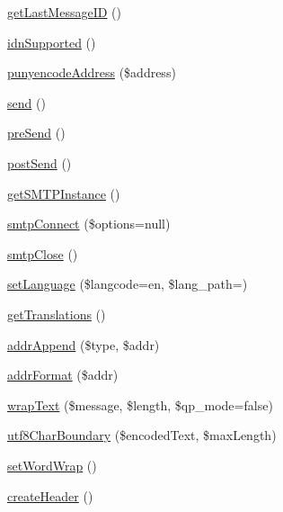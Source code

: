 \begin{DoxyCompactItemize}
\item 
\mbox{\hyperlink{class_p_h_p_mailer_abe341255f193c97147b97b274dbe5231}{get\+Last\+Message\+ID}} ()
\item 
\mbox{\hyperlink{class_p_h_p_mailer_adadc15cb1875252d0f695377ae405a1f}{idn\+Supported}} ()
\item 
\mbox{\hyperlink{class_p_h_p_mailer_a7e684e6070c16bfe7abef4bc11c48f42}{punyencode\+Address}} (\$address)
\item 
\mbox{\hyperlink{class_p_h_p_mailer_afdd4742f07cfb0bfa7be86ce20468fa3}{send}} ()
\item 
\mbox{\hyperlink{class_p_h_p_mailer_aaef84591efbd9b09f178aae6221933f0}{pre\+Send}} ()
\item 
\mbox{\hyperlink{class_p_h_p_mailer_a14c847b42d1147e0605c615cbe7510e6}{post\+Send}} ()
\item 
\mbox{\hyperlink{class_p_h_p_mailer_ac3a22964fd24af953bad3454e961e616}{get\+S\+M\+T\+P\+Instance}} ()
\item 
\mbox{\hyperlink{class_p_h_p_mailer_ad256b0d8cead706e1ed69ad148075773}{smtp\+Connect}} (\$options=null)
\item 
\mbox{\hyperlink{class_p_h_p_mailer_abc370b33386baa1c4bc927f812f7e8cc}{smtp\+Close}} ()
\item 
\mbox{\hyperlink{class_p_h_p_mailer_a0a036c9cfe49499ec35c39712575f8aa}{set\+Language}} (\$langcode=\textquotesingle{}en\textquotesingle{}, \$lang\+\_\+path=\textquotesingle{}\textquotesingle{})
\item 
\mbox{\hyperlink{class_p_h_p_mailer_a72c6fabba47dad807772801d1a6efdfb}{get\+Translations}} ()
\item 
\mbox{\hyperlink{class_p_h_p_mailer_a72d47213e885d38421847c0028b6b7de}{addr\+Append}} (\$type, \$addr)
\item 
\mbox{\hyperlink{class_p_h_p_mailer_ae6314aa12918fb6d71579d59550a2c2d}{addr\+Format}} (\$addr)
\item 
\mbox{\hyperlink{class_p_h_p_mailer_ab0d9b95d98d242bf6712173a1bebac2d}{wrap\+Text}} (\$message, \$length, \$qp\+\_\+mode=false)
\item 
\mbox{\hyperlink{class_p_h_p_mailer_a74c592dc553831e2730c3814da78fc09}{utf8\+Char\+Boundary}} (\$encoded\+Text, \$max\+Length)
\item 
\mbox{\hyperlink{class_p_h_p_mailer_a61decbe3be3dc0cc9562af8d0dbb7cdb}{set\+Word\+Wrap}} ()
\item 
\mbox{\hyperlink{class_p_h_p_mailer_add8dca06fe959bc4a081db2917ea99ba}{create\+Header}} ()
\item 

\end{DoxyCompactItemize}
